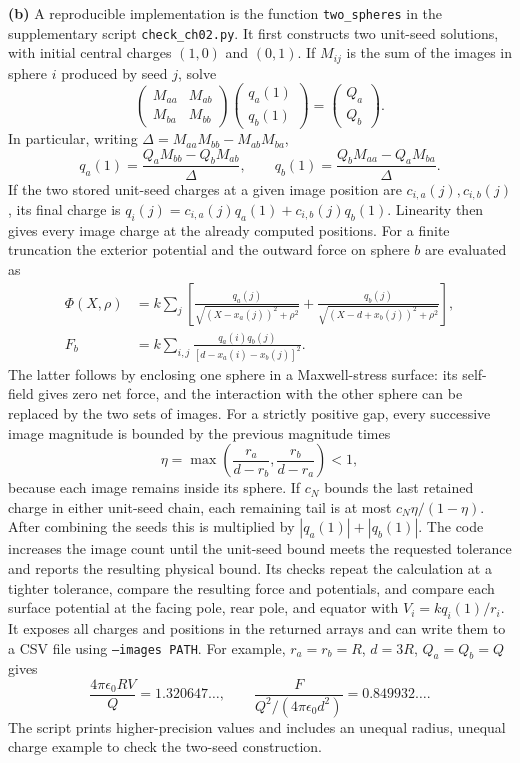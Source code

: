 \textbf{(b)} A reproducible implementation is the function
\texttt{two\_spheres} in the supplementary script
\texttt{check\_ch02.py}.
It first constructs two unit-seed solutions, with initial central
charges $(1,0)$ and $(0,1)$. If $M_{ij}$ is the sum of the images
in sphere $i$ produced by seed $j$, solve
\[
\begin{pmatrix}M_{aa}&M_{ab}\\M_{ba}&M_{bb}\end{pmatrix}
\begin{pmatrix}q_a(1)\\q_b(1)\end{pmatrix}
=\begin{pmatrix}Q_a\\Q_b\end{pmatrix}.
\]
In particular, writing $\Delta=M_{aa}M_{bb}-M_{ab}M_{ba}$,
\[
q_a(1)=\frac{Q_aM_{bb}-Q_bM_{ab}}\Delta,\qquad
q_b(1)=\frac{Q_bM_{aa}-Q_aM_{ba}}\Delta.
\]
If the two stored unit-seed charges at a given image position are
$c_{i,a}(j),c_{i,b}(j)$, its final charge is
$q_i(j)=c_{i,a}(j)q_a(1)+c_{i,b}(j)q_b(1)$.
Linearity then gives every image charge at the already computed
positions. For a finite truncation the exterior potential and the
outward force on sphere $b$ are evaluated as
\begin{align*}
\Phi(X,\rho)&=k\sum_j\left[
 \frac{q_a(j)}{\sqrt{(X-x_a(j))^2+\rho^2}}
+\frac{q_b(j)}{\sqrt{(X-d+x_b(j))^2+\rho^2}}\right],\\
F_b&=k\sum_{i,j}\frac{q_a(i)q_b(j)}{[d-x_a(i)-x_b(j)]^2}.
\end{align*}
The latter follows by enclosing one sphere in a Maxwell-stress
surface: its self-field gives zero net force, and the interaction
with the other sphere can be replaced by the two sets of images.
For a strictly positive gap, every successive image magnitude is
bounded by the previous magnitude times
\[
\eta=\max\left(\frac{r_a}{d-r_b},\frac{r_b}{d-r_a}\right)<1,
\]
because each image remains inside its sphere. If $c_N$ bounds the
last retained charge in either unit-seed chain, each remaining tail
is at most $c_N\eta/(1-\eta)$. After combining the seeds this is
multiplied by $|q_a(1)|+|q_b(1)|$. The code increases the image count
until the unit-seed bound meets the requested tolerance and reports
the resulting physical bound. Its checks repeat the calculation at a tighter tolerance,
compare the resulting force and potentials, and compare each surface
potential at the facing pole, rear pole, and equator with
$V_i=kq_i(1)/r_i$. It exposes all charges
and positions in the returned arrays and can write them to a CSV
file using \texttt{--images PATH}.
For example, $r_a=r_b=R$, $d=3R$, $Q_a=Q_b=Q$ gives
\[
\frac{4\pi\epsilon _0RV}{Q}=1.320647\ldots,\qquad
\frac{F}{Q^2/(4\pi\epsilon _0d^2)}=0.849932\ldots.
\]
The script prints higher-precision values and includes an unequal
radius, unequal charge example to check the two-seed construction.

